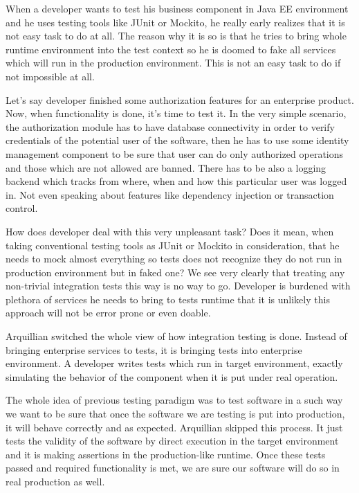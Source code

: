 \documentclass[12pt,final,oneside]{fithesis}
\begin{document}
When a developer wants to test his business component in Java EE environment and he uses testing tools like JUnit or Mockito, he really early realizes that it is not easy task to do at all. The reason why it is so is that he tries to bring whole runtime environment into the test context so he is doomed to fake all services which will run in the production environment. This is not an easy task to do if not impossible at all.

Let's say developer finished some authorization features for an enterprise product. Now, when functionality is done, it's time to test it. In the very simple scenario, the authorization module has to have database connectivity in order to verify credentials of the potential user of the software, then he has to use some identity management component to be sure that user can do only authorized operations and those which are not allowed are banned. There has to be also a logging backend which tracks from where, when and how this particular user was logged in. Not even speaking about features like dependency injection or transaction control.

How does developer deal with this very unpleasant task? Does it mean, when taking conventional testing tools as JUnit or Mockito in consideration, that he needs to mock almost everything so tests does not recognize they do not run in production environment but in faked one? We see very clearly that treating any non-trivial integration tests this way is no way to go. Developer is burdened with plethora of services he needs to bring to tests runtime that it is unlikely this approach will not be error prone or even doable.
	
Arquillian switched the whole view of how integration testing is done. Instead of bringing enterprise services to tests, it is bringing tests into enterprise environment. A developer writes tests which run in target environment, exactly simulating the behavior of the component when it is put under real operation.

The whole idea of previous testing paradigm was to test software in a such way we want to be sure that once the software we are testing is put into production, it will behave correctly and as expected. Arquillian skipped this process. It just tests the validity of the software by direct execution in the target environment and it is making assertions in the production-like runtime. Once these tests passed and required functionality is met, we are sure our software will do so in real production as well.
\end{document}
